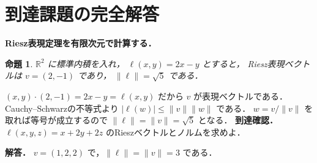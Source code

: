 \documentclass[a5paper,10pt,onecolumn]{jsarticle}
\makeatletter
\theoremstyle{mathnotetheorem}
\newtheorem{proposition}[theorem]{命題}
\renewcommand{\proofname}{証明}
\renewenvironment{proof}[1][\proofname]{%
  \par\pushQED{\qed}\normalfont\topsep4\p@\@plus2\p@\relax
  \trivlist\item[\hskip\labelsep\bfseries #1]\ignorespaces
}{\popQED\endtrivlist\@endpefalse}
\makeatother
\begin{document}
\section{到達課題の完全解答}
\noindent\textbf{Riesz表現定理を有限次元で計算する．}
\begin{proposition}
$\mathbb R^2$ に標準内積を入れ，
$\ell(x,y)=2x-y$ とすると，
Riesz表現ベクトルは $v=(2,-1)$ であり，
$\|\ell\|=\sqrt5$ である．
\end{proposition}
\begin{proof}
$(x,y)\cdot(2,-1)=2x-y=\ell(x,y)$ だから
$v$ が表現ベクトルである．
Cauchy--Schwarzの不等式より
$|\ell(w)|\le\|v\|\|w\|$ である．
$w=v/\|v\|$ を取れば等号が成立するので
$\|\ell\|=\|v\|=\sqrt5$ となる．
\end{proof}
\noindent\textbf{到達確認．}
$\ell(x,y,z)=x+2y+2z$ のRieszベクトルとノルムを求めよ．
\par\noindent\textbf{解答．}
$v=(1,2,2)$ で，$\|\ell\|=\|v\|=3$ である．
\end{document}
